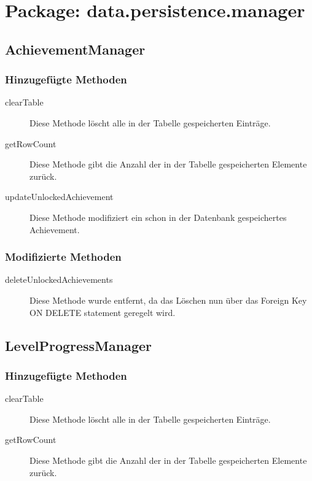 \section{Package: data.persistence.manager}

\subsection{AchievementManager}

\subsubsection{Hinzugefügte Methoden}
\begin{description}
\item[clearTable]
Diese Methode löscht alle in der Tabelle gespeicherten Einträge.
\item[getRowCount]
Diese Methode gibt die Anzahl der in der Tabelle gespeicherten Elemente zurück.
\item[updateUnlockedAchievement]
Diese Methode modifiziert ein schon in der Datenbank gespeichertes Achievement.
\end{description}

\subsubsection{Modifizierte Methoden}
\begin{description}
\item[deleteUnlockedAchievements]
Diese Methode wurde entfernt, da das Löschen nun über das Foreign Key ON DELETE statement geregelt wird.
\end{description}


\subsection{LevelProgressManager}

\subsubsection{Hinzugefügte Methoden}
\begin{description}
\item[clearTable]
Diese Methode löscht alle in der Tabelle gespeicherten Einträge.
\item[getRowCount]
Diese Methode gibt die Anzahl der in der Tabelle gespeicherten Elemente zurück.
\end{description}

